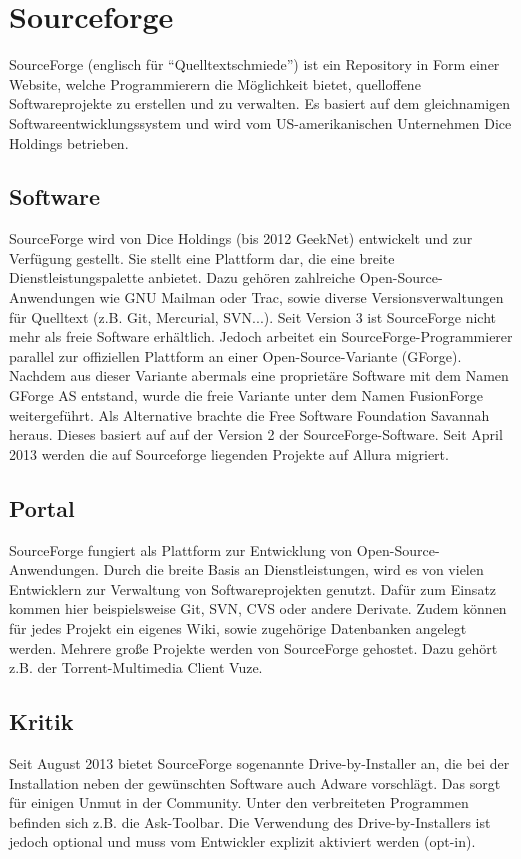 \section{Sourceforge}
SourceForge (englisch für ``Quelltextschmiede'') ist ein Repository in Form einer Website,
welche Programmierern die Möglichkeit bietet, quelloffene Softwareprojekte zu erstellen und zu verwalten. 
Es basiert auf dem gleichnamigen Softwareentwicklungssystem und wird vom US-amerikanischen Unternehmen 
Dice Holdings betrieben.
\subsection{Software}
SourceForge wird von Dice Holdings (bis 2012 GeekNet) entwickelt und zur Verfügung gestellt.
Sie stellt eine Plattform dar, die eine breite Dienstleistungspalette anbietet. Dazu gehören zahlreiche Open-Source-Anwendungen
wie GNU Mailman oder Trac, sowie diverse Versionsverwaltungen für Quelltext (z.B. Git, Mercurial, SVN...).
Seit Version 3 ist SourceForge nicht mehr als freie Software erhältlich. Jedoch arbeitet ein SourceForge-Programmierer
parallel zur offiziellen Plattform an einer Open-Source-Variante (GForge). Nachdem aus dieser Variante 
abermals eine proprietäre Software mit dem Namen GForge AS entstand, wurde die freie Variante unter dem Namen FusionForge
weitergeführt. Als Alternative brachte die Free Software Foundation Savannah heraus. Dieses basiert auf
auf der Version 2 der SourceForge-Software.
Seit April 2013 werden die auf Sourceforge liegenden Projekte auf Allura migriert.
\subsection{Portal}
SourceForge fungiert als Plattform zur Entwicklung von Open-Source-Anwendungen.
Durch die breite Basis an Dienstleistungen, wird es von vielen Entwicklern zur Verwaltung von Softwareprojekten genutzt.
Dafür zum Einsatz kommen hier beispielsweise Git, SVN, CVS oder andere Derivate. Zudem können für jedes Projekt ein eigenes Wiki, sowie zugehörige Datenbanken angelegt werden.
Mehrere große Projekte werden von SourceForge gehostet. Dazu gehört z.B. der Torrent-Multimedia Client Vuze.
\subsection{Kritik}
Seit August 2013 bietet SourceForge sogenannte Drive-by-Installer an, die bei der Installation 
neben der gewünschten Software auch Adware vorschlägt. Das sorgt für einigen Unmut in der Community. 
Unter den verbreiteten Programmen befinden sich z.B. die Ask-Toolbar. Die Verwendung des
Drive-by-Installers ist jedoch optional und muss vom Entwickler explizit aktiviert werden (opt-in).
